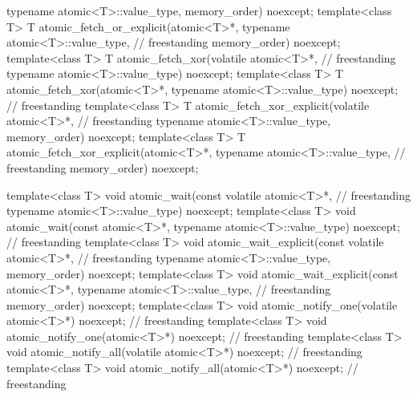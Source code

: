 \begin{codeblock}
{                               typename atomic<T>::value_type,
                               memory_order) noexcept;
  template<class T>
    T atomic_fetch_or_explicit(atomic<T>*, typename atomic<T>::value_type,          // freestanding
                               memory_order) noexcept;
  template<class T>
    T atomic_fetch_xor(volatile atomic<T>*,                                         // freestanding
                       typename atomic<T>::value_type) noexcept;
  template<class T>
    T atomic_fetch_xor(atomic<T>*, typename atomic<T>::value_type) noexcept;        // freestanding
  template<class T>
    T atomic_fetch_xor_explicit(volatile atomic<T>*,                                // freestanding
                                typename atomic<T>::value_type,
                                memory_order) noexcept;
  template<class T>
    T atomic_fetch_xor_explicit(atomic<T>*, typename atomic<T>::value_type,         // freestanding
                                memory_order) noexcept;

  template<class T>
    void atomic_wait(const volatile atomic<T>*,                                     // freestanding
	             typename atomic<T>::value_type) noexcept;
  template<class T>
    void atomic_wait(const atomic<T>*, typename atomic<T>::value_type) noexcept;    // freestanding
  template<class T>
    void atomic_wait_explicit(const volatile atomic<T>*,                            // freestanding
                              typename atomic<T>::value_type,
                              memory_order) noexcept;
  template<class T>
    void atomic_wait_explicit(const atomic<T>*, typename atomic<T>::value_type,     // freestanding
                              memory_order) noexcept;
  template<class T>
    void atomic_notify_one(volatile atomic<T>*) noexcept;                           // freestanding
  template<class T>
    void atomic_notify_one(atomic<T>*) noexcept;                                    // freestanding
  template<class T>
    void atomic_notify_all(volatile atomic<T>*) noexcept;                           // freestanding
  template<class T>
    void atomic_notify_all(atomic<T>*) noexcept;                                    // freestanding

}
\end{codeblock}
